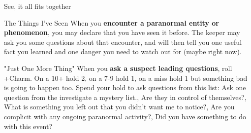 {\begin{move}[]{See, it all fits together}
\end{move}%
\br[1mm]
%
\begin{move}{The Things I've Seen}
When you \textbf{encounter a paranormal entity or phenomenon}, you may declare that you have seen it before.  The keeper may ask you some questions about that encounter, and will then tell you one useful fact you learned and one danger you need to watch out for (maybe right now).
\end{move}%
\br[1mm]
%
\begin{move}{"Just One More Thing"}
When you \textbf{ask a suspect leading questions}, roll +Charm. On a 10+ hold 2, on a 7-9 hold 1, on a miss hold 1 but something bad is going to happen too. Spend your hold to ask questions from this list:
\holdoptions%
{Ask one question from the investigate a mystery list.,
Are they in control of themselves?,
What is something you left out that you didn’t want me to notice?,
Are you complicit with any ongoing paranormal activity?,
Did you have something to do with this event?}
\end{move}
%
}\pagebreak%
%
